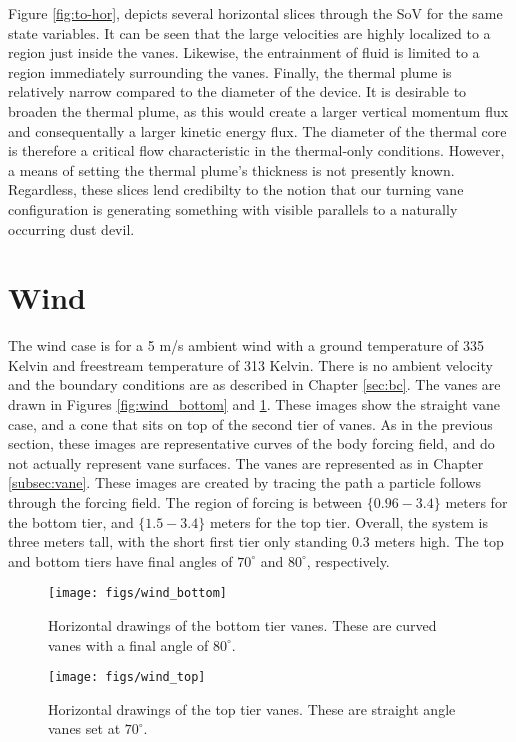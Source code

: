 Figure \ref{fig:to-hor}, depicts several horizontal slices
through the SoV for the same state variables. It can be seen that the
large velocities are highly localized to a region just inside the
vanes. Likewise, the entrainment of fluid is limited to a region
immediately surrounding the vanes. 
%
%
Finally, the thermal plume is relatively
narrow compared to the diameter of the device. It is desirable to
broaden the thermal plume, as this would create a larger vertical
momentum flux and consequentally a larger kinetic energy flux. 
The diameter of the thermal core is therefore a critical flow
characteristic in the thermal-only conditions. However, a means of
setting the thermal plume's thickness is not presently 
known. Regardless, these slices lend credibilty to the 
notion that our turning vane configuration is generating something with
visible parallels to a naturally occurring dust devil.   

\section{Wind}

The wind case is for a 5 m/s ambient wind with a ground temperature of
335 Kelvin and freestream temperature of 313 Kelvin. There is no ambient
velocity and the boundary conditions are as described in Chapter
\ref{sec:bc}. The vanes are drawn in Figures \ref{fig:wind_bottom} and
\ref{fig:wind_top}. These images show the straight vane case, and
a cone that sits on top of the second tier of vanes. 
As in the previous section, these images are representative
curves of the body forcing field, and do not actually represent vane
surfaces. The vanes are represented as in Chapter \ref{subsec:vane}. 
These images are created by tracing the path a particle follows through
the forcing field. The region of forcing is between $\{0.96-3.4\}$ meters
for the bottom tier, and $\{1.5-3.4\}$ meters for the top tier. Overall,
the system is three meters tall, with the short first tier only standing
0.3 meters high. The top and bottom tiers have final angles of
$70^{\circ}$ and $80^{\circ}$, respectively. 

\begin{figure}[htb]
\centering
\begin{minipage}{0.45\textwidth}
\centering
 \texttt{[image: figs/wind\_bottom]}
 \caption{Horizontal drawings of the bottom tier vanes. These are curved 
 vanes with a final angle of $80^{\circ}$.}
 \label{fig:wind_bottom}  
\end{minipage}\hfill
\begin{minipage}{0.45\textwidth}
\centering
\texttt{[image: figs/wind\_top]}
\caption{Horizontal drawings of the top tier vanes. These are straight
 angle vanes set at $70^{\circ}$.} 
 \label{fig:wind_top}  
\end{minipage}
\end{figure}


